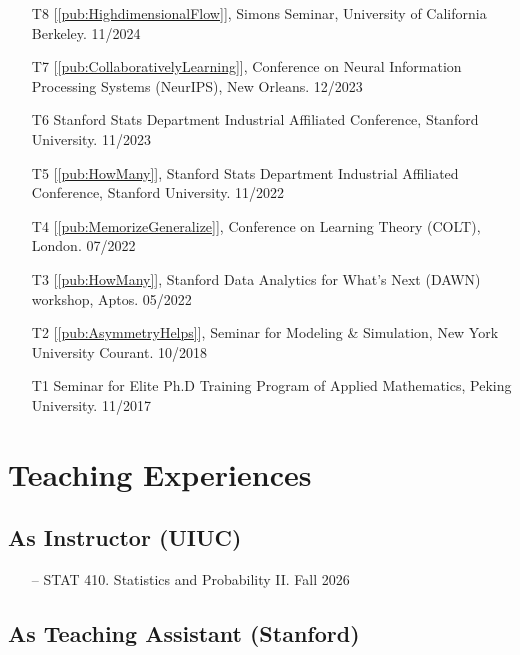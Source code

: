 \documentclass[10pt, a4paper]{article}
\makeatletter
\newcommand{\cvdategap}{\hspace{1.5em}\hfill}
\def\namedlabel#1#2{\begingroup
	#2%
	\def\@currentlabel{#2}%
	\phantomsection\label{#1}\endgroup
}
\makeatother
\begin{document}
\begin{enumerate}
	\item[\namedlabel{talk:Berkeley-24-1}{T8}] [\ref{pub:HighdimensionalFlow}], Simons Seminar, University of California Berkeley. \cvdategap 11/2024
	\item[\namedlabel{talk:NeurIPS-23-1}{T7}] [\ref{pub:CollaborativelyLearning}], Conference on Neural Information Processing Systems (NeurIPS), New Orleans. \cvdategap 12/2023
	\item[\namedlabel{talk:StanfordIAC-23-1}{T6}] Stanford Stats Department Industrial Affiliated Conference, Stanford University. \cvdategap 11/2023
	\item[\namedlabel{talk:StanfordIAC-22-1}{T5}] [\ref{pub:HowMany}], Stanford Stats Department Industrial Affiliated Conference, Stanford University. \cvdategap 11/2022
	\item[\namedlabel{talk:COLT-22-1}{T4}] [\ref{pub:MemorizeGeneralize}], Conference on Learning Theory (COLT), London. \cvdategap 07/2022
	\item[\namedlabel{talk:StanfordDAWN-22-1}{T3}] [\ref{pub:HowMany}], Stanford Data Analytics for What’s Next (DAWN) workshop, Aptos. \cvdategap 05/2022
	\item[\namedlabel{talk:NYU-18-1}{T2}] [\ref{pub:AsymmetryHelps}], Seminar for Modeling \& Simulation, New York University Courant. \cvdategap 10/2018
	\item[\namedlabel{talk:PKU-17-1}{T1}] Seminar for Elite Ph.D Training Program of Applied Mathematics, Peking University. \cvdategap 11/2017
\end{enumerate}

\section*{\textbf{Teaching Experiences}}

\subsection*{\textbf{As Instructor (UIUC)}}

\begin{itemize}
	\item[--] STAT 410. Statistics and Probability II. \cvdategap Fall 2026
\end{itemize}

\subsection*{\textbf{As Teaching Assistant (Stanford)}}
\end{document}
